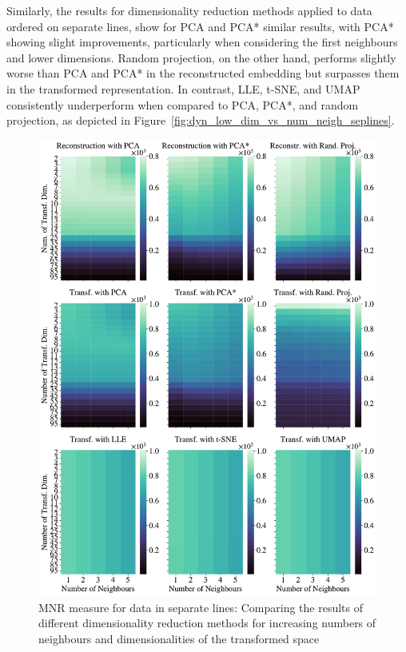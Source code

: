 \documentclass[pdftex,12pt,a4paper]{report}
\begin{document}
Similarly, the results for dimensionality reduction methods applied to data ordered on separate lines, show for PCA and PCA* similar results, with PCA* showing slight improvements, particularly when considering the first neighbours and lower dimensions.
Random projection, on the other hand, performs slightly worse than PCA and PCA* in the reconstructed embedding but surpasses them in the transformed representation.
In contrast, LLE, t-SNE, and UMAP consistently underperform when compared to PCA, PCA*, and random projection, as depicted in Figure~\ref{fig:dyn_low_dim_vs_num_neigh_seplines}.

\begin{figure}[htb!]
    \includegraphics*[width= \textwidth]{images/multiple_runs/sep_lines/dyn_low_dim_vs_num_neigh/multiple_scalar_product/all_methods_10runs_5lines_100points_5neighbours.pdf}
    \caption{MNR measure for data in separate lines: Comparing the results of different dimensionality reduction methods for increasing numbers of neighbours and dimensionalities of the transformed space} \label{fig:dyn_low_dim_vs_num_neigh_seplines_scal}
\end{figure}
\end{document}
